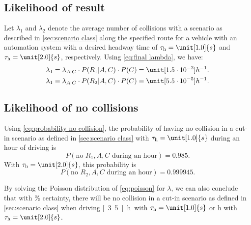 \subsection{Likelihood of result}
\label{sec:example result}

Let $\lambda_1$ and $\lambda_2$ denote the average number of collisions with a scenario as described in \cref{sec:scenario class} along the specified route for a vehicle with an automation system with a desired headway time of $\tau_{\mathrm{h}}=\unit[1.0]{s}$ and $\tau_{\mathrm{h}}=\unit[2.0]{s}$, respectively. Using \cref{eq:final lambda}, we have:
\begin{align}
	\lambda_1 &= \lambda_{A|C} \cdot P(R_1|A,C) \cdot P(C) = \unit[1.5 \cdot 10^{-2}]{h^{-1}}. \\	\lambda_1 &= \lambda_{A|C} \cdot P(R_2|A,C) \cdot P(C) = \unit[5.5 \cdot 10^{-5}]{h^{-1}}.
\end{align}

\subsection{Likelihood of no collisions}
\label{sec:example no collisions}

Using \cref{eq:probability no collision}, the probability of having no collision in a cut-in scenario as defined in \cref{sec:scenario class} with $\tau_{\mathrm{h}}=\unit[1.0]{s}$ during an hour of driving is
\begin{equation}
	P(\text{no }R_1,A,C\text{ during an hour}) = 0.985.
\end{equation}
With $\tau_{\mathrm{h}}=\unit[2.0]{s}$, this probability is 
\begin{equation}
	P(\text{no }R_2,A,C\text{ during an hour}) = 0.999945.
\end{equation}

By solving the Poisson distribution of \cref{eq:poisson} for $\lambda$, we can also conclude that with \unit[95]{\%} certainty, there will be no collision in a cut-in scenario as defined in \cref{sec:scenario class} when driving \unit[3.5]{h} with $\tau_{\mathrm{h}}=\unit[1.0]{s}$ or \unit[925]{h} with $\tau_{\mathrm{h}}=\unit[2.0]{s}$.
